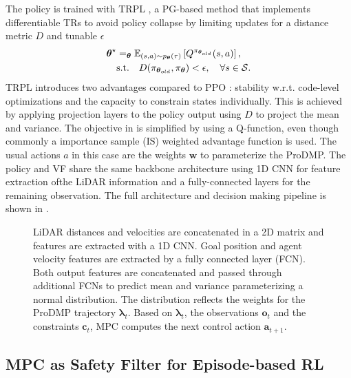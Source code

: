\documentclass[letterpaper,conference,10pt]{IEEEconf}
\let\argmax\relax
\DeclareMathOperator*{\argmax}{arg\!max}
\begin{document}
The policy is trained with TRPL \cite{otto_differentiable_2020}, a PG-based method that implements differentiable TRs to avoid policy collapse by limiting updates for a distance metric $D$ and tunable $\epsilon$
\begin{align}
    \label{eq:tr_rl}
    \boldsymbol{\theta}^\star&=\argmax_{\boldsymbol{\theta}}\mathbb{E}_{(s,a)\sim p_{\boldsymbol{\theta}}(\tau)}\left[Q^{\pi_{\boldsymbol{\theta}_{old}}}(s,a)\right], \nonumber \\
    &\text{s.t.}\quad D(\pi_{\boldsymbol{\theta}_{old}}, \pi_{\boldsymbol{\theta}}) < \epsilon,\quad \forall s\in\mathcal{S}.
\end{align}
TRPL introduces two advantages compared to PPO \cite{schulman2017ppo}: stability w.r.t. code-level optimizations \cite{Engstrom2020Implementation} and the capacity to constrain states individually. This is achieved by applying projection layers to the policy output using $D$ to project the mean and variance. The objective in  is simplified by using a Q-function, even though commonly a importance sample (IS) weighted advantage function is used. The usual actions $a$ in this case are the weights $\boldsymbol{w}$ to parameterize the ProDMP. The policy and VF share the same backbone architecture using 1D CNN for feature extraction ofthe LiDAR information and a fully-connected layers for the remaining observation. The full architecture and decision making pipeline is shown in .
\setlength{\textfloatsep}{2pt plus 1pt minus 1pt}
\begin{figure}[t]
    \centering
        \resizebox{8cm}{!}{}
    \caption{LiDAR distances and velocities are concatenated in a 2D matrix and features are extracted with a 1D CNN. Goal position and agent velocity features are extracted by a fully connected layer (FCN). Both output features are concatenated and passed through additional FCNs to predict mean and variance parameterizing a normal distribution. The distribution reflects the weights for the ProDMP trajectory $\boldsymbol{\lambda}_t$. Based on $\boldsymbol{\lambda}_t$, the observations $\boldsymbol{o}_t$ and the constraints $\boldsymbol{c}_t$, MPC computes the next control action $\boldsymbol{a}_{t+1}$.}
    \label{fig:policy}
\end{figure}

\subsection{MPC as Safety Filter for Episode-based RL}\label{sec:const}
\end{document}
